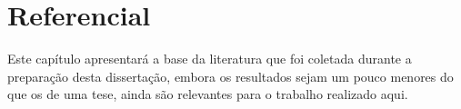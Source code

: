 \section{Referencial}\label{sec:refteo}


Este capítulo apresentará a base da literatura que foi coletada durante a preparação desta dissertação, embora os resultados sejam um pouco menores do que os de uma tese, ainda são relevantes para o trabalho realizado aqui.





















